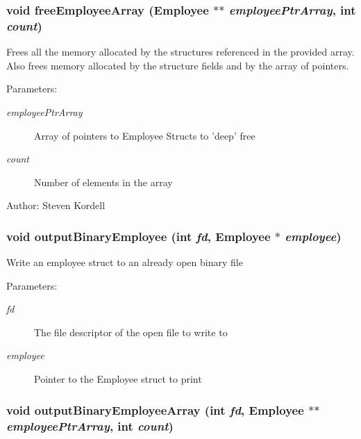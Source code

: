 \subsubsection{\setlength{\rightskip}{0pt plus 5cm}void free\-Employee\-Array (\bf{Employee} $\ast$$\ast$ {\em employee\-Ptr\-Array}, int {\em count})}\label{employeef_8h_8a5aa9726b277df85bf9f7abe2ba1f87}


Frees all the memory allocated by the structures referenced in the provided array. Also frees memory allocated by the structure fields and by the array of pointers. \begin{Desc}
\item[Parameters:]
\begin{description}
\item[{\em employee\-Ptr\-Array}]Array of pointers to Employee Structs to 'deep' free \item[{\em count}]Number of elements in the array \end{description}
\end{Desc}
\begin{Desc}
\item[Author:]Steven Kordell \end{Desc}
\subsubsection{\setlength{\rightskip}{0pt plus 5cm}void output\-Binary\-Employee (int {\em fd}, \bf{Employee} $\ast$ {\em employee})}\label{employeef_8h_25cbcfd9c163ee12b69d989599c8f419}


Write an employee struct to an already open binary file \begin{Desc}
\item[Parameters:]
\begin{description}
\item[{\em fd}]The file descriptor of the open file to write to \item[{\em employee}]Pointer to the Employee struct to print \end{description}
\end{Desc}
\subsubsection{\setlength{\rightskip}{0pt plus 5cm}void output\-Binary\-Employee\-Array (int {\em fd}, \bf{Employee} $\ast$$\ast$ {\em employee\-Ptr\-Array}, int {\em count})}\label{employeef_8h_2226d8df976edffea159ac02ed4b1485}


